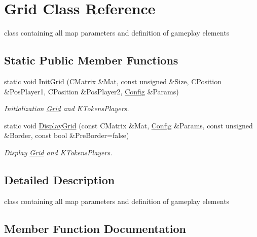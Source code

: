\hypertarget{class_grid}{}\section{Grid Class Reference}
\label{class_grid}


class containing all map parameters and definition of gameplay elements  


\subsection*{Static Public Member Functions}
\begin{DoxyCompactItemize}
\item 
static void \hyperlink{class_grid_aea1cbab2ead138ea62adb08bca198864}{Init\+Grid} (C\+Matrix \&Mat, const unsigned \&Size, C\+Position \&Pos\+Player1, C\+Position \&Pos\+Player2, \hyperlink{class_config}{Config} \&Params)
\begin{DoxyCompactList}\small\item\em Initialization \hyperlink{class_grid}{Grid} and K\+Tokens\+Players. \end{DoxyCompactList}\item 
static void \hyperlink{class_grid_a75599f3518dc3a53f372edf4afc939ea}{Display\+Grid} (const C\+Matrix \&Mat, \hyperlink{class_config}{Config} \&Params, const unsigned \&Border, const bool \&Pre\+Border=false)
\begin{DoxyCompactList}\small\item\em Display \hyperlink{class_grid}{Grid} and K\+Tokens\+Players. \end{DoxyCompactList}\end{DoxyCompactItemize}


\subsection{Detailed Description}
class containing all map parameters and definition of gameplay elements 

\subsection{Member Function Documentation}
\mbox{\label{class_grid_a75599f3518dc3a53f372edf4afc939ea}} 
